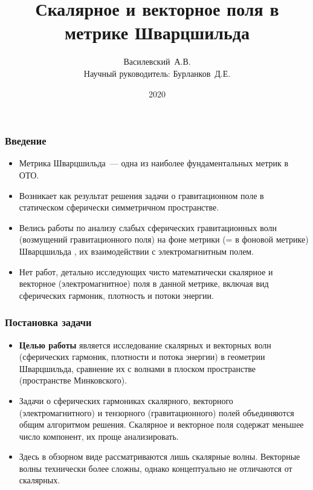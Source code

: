 \documentclass[compress, 9pt]{beamer}
\title{Скалярное и векторное поля в метрике Шварцшильда}
\author[Василевский~А.В.]{
    Василевский~А.В. \\[\baselineskip]
    {\footnotesize Научный руководитель: Бурланков~Д.Е.}
}
\institute[ННГУ]{Нижегородский университет им. Н.И.~Лобачевского}
\date{2020}
\begin{document}
    \frame[plain]{\titlepage}

    \begin{frame}\frametitle{Введение}

        \begin{itemize}\justifying
            \item Метрика Шварцшильда~--- одна из наиболее фундаментальных метрик в ОТО.
            \item Возникает как результат решения задачи о гравитационном поле в статическом сферически симметричном пространстве.
            \item Велись работы по анализу слабых сферических гравитационных волн (возмущений гравитационного поля) на фоне метрики (= в фоновой метрике) Шварцшильда \cite{regge_wheeler_1957,Vas2019b}, их взаимодействии с электромагнитным полем.
            \item Нет работ, детально исследующих чисто математически скалярное и векторное (электромагнитное) поля в данной метрике, включая вид сферических гармоник, плотность и потоки энергии.
        \end{itemize}

    \end{frame}

    \begin{frame}\frametitle{Постановка задачи}

        \begin{itemize}\justifying
            \item \textbf{Целью работы} является исследование скалярных и векторных волн (сферических гармоник, плотности и потока энергии) в геометрии Шварцшильда, сравнение их с волнами в плоском пространстве (пространстве Минковского).

            \item Задачи о сферических гармониках скалярного, векторного (электромагнитного) и тензорного (гравитационного) полей объединяются общим алгоритмом решения. Скалярное и векторное поля содержат меньшее число компонент, их проще анализировать.

            \item Здесь в обзорном виде рассматриваются лишь скалярные волны. Векторные волны технически более сложны, однако концептуально не отличаются от скалярных.
        \end{itemize}

    \end{frame}
\end{document}
